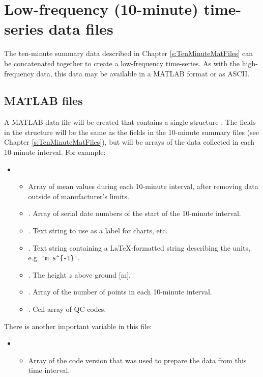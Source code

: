 \chapter{Low-frequency (10-minute) time-series data files}
The ten-minute summary data described in Chapter \ref{s:TenMinuteMatFiles} can be concatenated together to create a low-frequency time-series. As with the high-frequency data, this data may be available in a MATLAB format or as ASCII.

\section{MATLAB files\label{s:LFMatlab}}
A MATLAB data file will be created that contains a single structure . The fields in the structure will be the same as the fields in the 10-minute summary files (see Chapter \ref{s:TenMinuteMatFiles}), but will be arrays of the data collected in each 10-minute interval. For example:
\begin{itemize}
\item {}
\begin{itemize}
\item {} Array of mean values during each 10-minute interval, after removing data outside of manufacturer's limits.
\item {}. Array of serial date numbers of the start of the 10-minute interval.
\item {}. Text string to use as a label for charts, etc.
\item {}. Text string containing a \LaTeX-formatted string describing the units, e.g. \verb+'m s^{-1}'+.
\item {}. The height $z$ above ground [m].
\item {}. Array of the number of points in each 10-minute interval.
\item {}. Cell array of QC codes.
\end{itemize}
\end{itemize}

There is another important variable in this file:
\begin{itemize}
\item {}
\begin{itemize}
\item {} Array of the code version that was used to prepare the data from this time interval. 
\end{itemize}
\end{itemize}

